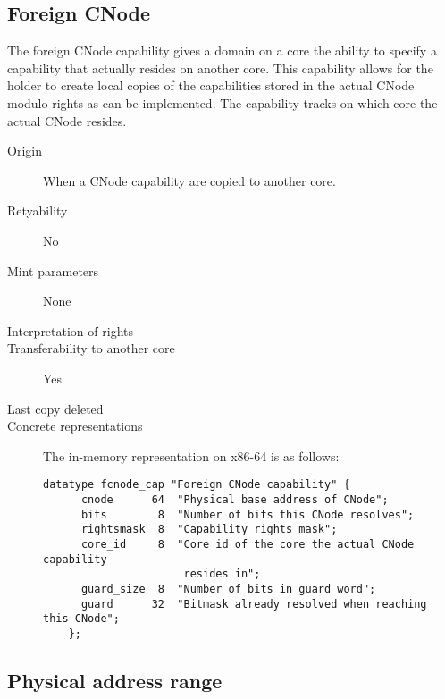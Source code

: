 \subsection{Foreign CNode}

The foreign CNode capability gives a domain on a core the ability to
specify a capability that actually resides on another core.  This
capability allows for the holder to create local copies of the
capabilities stored in the actual CNode modulo rights as can be
implemented.  The capability tracks on which core the actual CNode
resides.  

\begin{description}
\item[Origin] When a CNode capability are copied to another core.

\item[Retyability] No

\item[Mint parameters] None
  
\item[Interpretation of rights] 
  
\item[Transferability to another core] Yes

\item[Last copy deleted] 
  
\item[Concrete representations] The in-memory representation on x86-64 is as follows:
  
  \begin{lstlisting}[language=Mackerel]
    datatype fcnode_cap "Foreign CNode capability" {
      cnode      64  "Physical base address of CNode";
      bits        8  "Number of bits this CNode resolves";
      rightsmask  8  "Capability rights mask";
      core_id     8  "Core id of the core the actual CNode capability
                      resides in";
      guard_size  8  "Number of bits in guard word";
      guard      32  "Bitmask already resolved when reaching this CNode";
    };
  \end{lstlisting}
\end{description}


\subsection{Physical address range}

